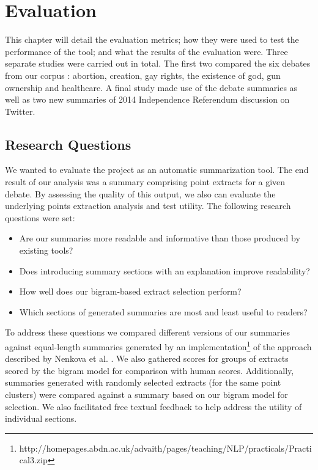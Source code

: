 \chapter{Evaluation\label{chap:evaluation}}
  This chapter will detail the evaluation metrics; how they were used to test the performance of the tool; and what the results of the evaluation were. Three separate studies were carried out in total. The first two compared the six debates from our corpus \cite{walker2012corpus}: abortion, creation, gay rights, the existence of god, gun ownership and healthcare. A final study made use of the debate summaries as well as two new summaries of 2014 Independence Referendum discussion on Twitter.

  \section{Research Questions}
    We wanted to evaluate the project as an automatic summarization tool. The end result of our analysis was a summary comprising point extracts for a given debate. By assessing the quality of this output, we also can evaluate the underlying points extraction analysis and test utility. The following research questions were set:

    \begin{itemize}
      \item{Are our summaries more readable and informative than those produced by existing tools?}
      \item{Does introducing summary sections with an explanation improve readability?}
      \item{How well does our bigram-based extract selection perform?}
      \item{Which sections of generated summaries are most and least useful to readers?}
    \end{itemize}

    To address these questions we compared different versions of our summaries against equal-length summaries generated by an implementation\footnote{http://homepages.abdn.ac.uk/advaith/pages/teaching/NLP/practicals/Practical3.zip} of the approach described by Nenkova et al. \cite{nenkova2006compositional}. We also gathered scores for groups of extracts scored by the bigram model for comparison with human scores. Additionally, summaries generated with randomly selected extracts (for the same point clusters) were compared against a summary based on our bigram model for selection. We also facilitated free textual feedback to help address the utility of individual sections.


